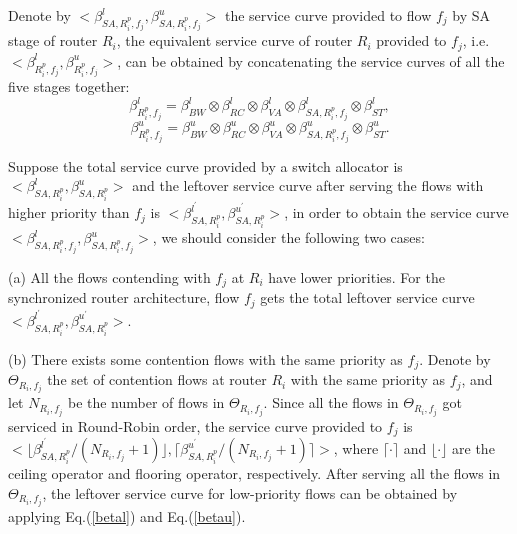 \documentclass[10pt,journal]{IEEEtran}
\begin{document}
Denote by $<\beta_{SA,R_i^{p},f_j}^l,\beta_{SA,R_i^{p},f_j}^u>$ the service curve provided to flow $f_j$ by SA stage of router $R_i$, the equivalent service curve of router $R_i$ provided to $f_j$, i.e. $<\beta_{R_i^{p},f_j}^l,\beta_{R_i^{p},f_j}^u>$, can be obtained by concatenating the service curves of all the five stages together:
$$\beta_{R_i^{p},f_j}^l=\beta_{BW}^l\otimes\beta_{RC}^l\otimes\beta_{VA}^l\otimes\beta_{SA,R_i^{p},f_j}^l\otimes \beta_{ST}^l,$$
$$\beta_{R_i^{p},f_j}^u=\beta_{BW}^u\otimes\beta_{RC}^u\otimes\beta_{VA}^u\otimes\beta_{SA,R_i^{p},f_j}^u\otimes \beta_{ST}^u.$$

Suppose the total service curve provided by a switch allocator is $<\beta_{SA,R_i^{p}}^l,\beta_{SA,R_i^{p}}^u>$ and the leftover service curve after serving the flows with higher priority than $f_j$ is $<\beta_{SA,R_i^{p}}^{l^\prime},\beta_{SA,R_i^{p}}^{u^\prime}>$, in order to obtain the service curve $<\beta_{SA,R_i^{p},f_j}^l,\beta_{SA,R_i^{p},f_j}^u>$, we should consider the following two cases:

(a) All the flows contending with $f_j$ at $R_i$ have lower priorities. For the synchronized router architecture, flow $f_j$ gets the total leftover service curve $<\beta_{SA,R_i^{p}}^{l^\prime},\beta_{SA,R_i^{p}}^{u^\prime}>$.

(b) There exists some contention flows with the same priority as $f_j$. Denote by $\Theta_{R_i,f_j}$ the set of contention flows at router $R_i$ with the same priority as $f_j$, and let $N_{R_i,f_j}$ be the number of flows in $\Theta_{R_i,f_j}$. Since all the flows in $\Theta_{R_i,f_j}$ got serviced in Round-Robin order, the service curve provided to $f_j$ is $<\lfloor\beta^{l^\prime}_{SA,R_i^{p}}/(N_{R_i,f_j}+1)\rfloor,\lceil\beta^{u^\prime}_{SA,R_i^{p}}/(N_{R_i,f_j}+1)\rceil>$, where $\lceil\cdot\rceil$ and $\lfloor\cdot\rfloor$ are the ceiling operator and flooring operator, respectively. After serving all the flows in $\Theta_{R_i,f_j}$, the leftover service curve for low-priority flows can be obtained by applying Eq.(\ref{betal}) and Eq.(\ref{betau}).
\end{document}

